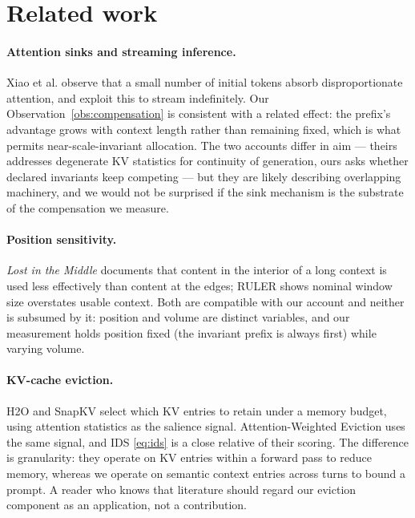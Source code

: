 \documentclass[11pt,a4paper]{article}
\theoremstyle{plain}
\theoremstyle{definition}
\theoremstyle{remark}
\begin{document}
\section{Related work}
\label{sec:related}

\paragraph{Attention sinks and streaming inference.} Xiao et al.
\cite{xiao2023streamingllm} observe that a small number of initial tokens
absorb disproportionate attention, and exploit this to stream indefinitely. Our
Observation~\ref{obs:compensation} is consistent with a related effect: the
prefix's advantage grows with context length rather than remaining fixed, which
is what permits near-scale-invariant allocation. The two accounts differ in aim
--- theirs addresses degenerate KV statistics for continuity of generation,
ours asks whether declared invariants keep competing --- but they are likely
describing overlapping machinery, and we would not be surprised if the sink
mechanism is the substrate of the compensation we measure.

\paragraph{Position sensitivity.} \emph{Lost in the Middle}
\cite{liu2023lost} documents that content in the interior of a long context is
used less effectively than content at the edges; RULER \cite{hsieh2024ruler}
shows nominal window size overstates usable context. Both are compatible with
our account and neither is subsumed by it: position and volume are distinct
variables, and our measurement holds position fixed (the invariant prefix is
always first) while varying volume.

\paragraph{KV-cache eviction.} H2O \cite{zhang2023h2o} and SnapKV
\cite{li2024snapkv} select which KV entries to retain under a memory budget,
using attention statistics as the salience signal. Attention-Weighted Eviction
uses the same signal, and IDS \eqref{eq:ids} is a close relative of their
scoring. The difference is granularity: they operate on KV entries within a
forward pass to reduce memory, whereas we operate on semantic context entries
across turns to bound a prompt. A reader who knows that literature should regard
our eviction component as an application, not a contribution.
\end{document}
